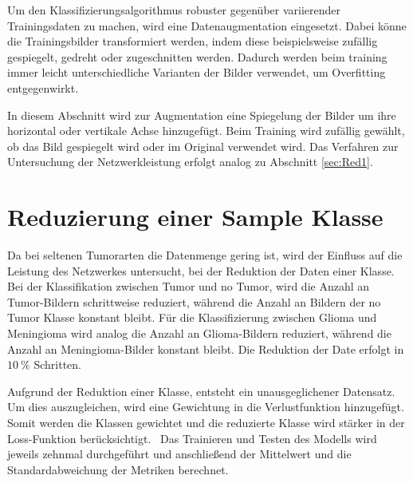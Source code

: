 Um den Klassifizierungsalgorithmus robuster gegenüber variierender Trainingsdaten zu machen, wird eine Datenaugmentation eingesetzt.
Dabei könne die Trainingsbilder transformiert werden, indem diese beispielsweise zufällig gespiegelt, gedreht oder zugeschnitten werden. 
Dadurch werden beim training immer leicht unterschiedliche Varianten der Bilder verwendet, um Overfitting entgegenwirkt.~\cite{Yamashita2018}

In diesem Abschnitt wird zur Augmentation eine Spiegelung der Bilder um ihre horizontal oder vertikale Achse hinzugefügt.
Beim Training wird zufällig gewählt, ob das Bild gespiegelt wird oder im Original verwendet wird.
Das Verfahren zur Untersuchung der Netzwerkleistung erfolgt analog zu Abschnitt \ref{sec:Red1}.    

\section{Reduzierung einer Sample Klasse}

Da bei seltenen Tumorarten die Datenmenge gering ist, wird der Einfluss auf die Leistung des Netzwerkes untersucht, 
bei der Reduktion der Daten einer Klasse.
Bei der Klassifikation zwischen Tumor und no Tumor, wird die Anzahl an Tumor-Bildern schrittweise reduziert, 
während die Anzahl an Bildern der no Tumor Klasse konstant bleibt.
Für die Klassifizierung zwischen Glioma und Meningioma wird analog die Anzahl an Glioma-Bildern reduziert, während die Anzahl an Meningioma-Bilder konstant bleibt.
Die Reduktion der Date erfolgt in $\qty{10}{\%}$ Schritten. 

Aufgrund der Reduktion einer Klasse, entsteht ein unausgeglichener Datensatz.
Um dies auszugleichen, wird eine Gewichtung in die Verlustfunktion hinzugefügt.
Somit werden die Klassen gewichtet und die reduzierte Klasse wird stärker in der Loss-Funktion berücksichtigt.~\cite{pytorchCrossEntropy}
Das Trainieren und Testen des Modells wird jeweils zehnmal durchgeführt und anschließend der Mittelwert und die Standardabweichung der
Metriken berechnet.


